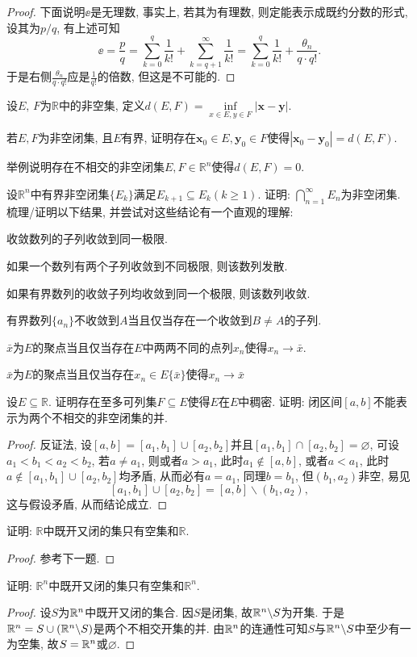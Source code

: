 \begin{quiza}
\begin{proof}
下面说明\(\ee\)是无理数, 事实上, 若其为有理数, 则定能表示成既约分数的形式, 设其为\(p/q\), 有上述可知\[\ee=\frac{p}{q}=\sum_{k=0}^{q}\frac{1}{k!}+\sum_{k=q+1}^{\infty}\frac{1}{k!}=\sum_{k=0}^{q}\frac{1}{k!}+\frac{\theta_n}{q\cdot q!}.\]于是右侧\(\frac{\theta_n}{q\cdot q!}\)应是\(\frac{1}{q!}\)的倍数, 但这是不可能的.
\end{proof}
\woe 设\(E,\,F\)为\(\mathbb{R}\)中的非空集, 定义\(d(E,F)=\underset{x\in E,y\in F}{\inf}|\boldsymbol{x}-\boldsymbol{y}|.\)
\begin{quizs}
      \item 若\(E,F\)为非空闭集, 且\(E\)有界, 证明存在\(\boldsymbol{x}_0\in E,\boldsymbol{y}_0\in F\)使得\(|\boldsymbol{x}_0-\boldsymbol{y}_0|=d(E,F)\).
      \item 举例说明存在不相交的非空闭集\(E,F\in \mathbb{R}^n\)使得\(d(E,F)=0\).
\end{quizs}
\woe 设\(\mathbb{R}^n\)中有界非空闭集\(\{E_k\}\)满足\(E_{k+1}\subseteq E_{k}(k\geqslant 1)\). 证明: \(\bigcap_{n=1}^\infty E_n\)为非空闭集.
\woestar 梳理/证明以下结果, 并尝试对这些结论有一个直观的理解:
\begin{quizcs}
\item 收敛数列的子列收敛到同一极限.
\item 如果一个数列有两个子列收敛到不同极限, 则该数列发散.
\item 如果有界数列的收敛子列均收敛到同一个极限, 则该数列收敛.
\item 有界数列\(\{a_n\}\)不收敛到\(A\)当且仅当存在一个收敛到\(B\ne A\)的子列.
\item \(\bar{x}\)为\(E\)的聚点当且仅当存在\(E\)中两两不同的点列\(x_n\)使得\(x_n\rightarrow \bar{x}\).
\item \(\bar{x}\)为\(E\)的聚点当且仅当存在\(x_n\in E \{\bar{x}\}\)使得\(x_n\rightarrow \bar{x}\)
\end{quizcs}
\begin{solution}
	
\end{solution}
\woe 设\(E\subseteq \mathbb{R}\). 证明存在至多可列集\(F\subseteq E\)使得\(E\)在\(E\)中稠密.
\woe 证明: 闭区间\([a,b]\)不能表示为两个不相交的非空闭集的并.
\begin{proof}
	反证法, 设\([a,b]=[a_1,b_1]\cup [a_2,b_2]\)并且\([a_1,b_1]\cap [a_2,b_2]=\varnothing\), 可设\(a_1<b_1<a_2<b_2\), 若\(a\ne a_1\), 则或者\(a>a_1\), 此时\(a_1\notin [a,b]\), 或者\(a<a_1\), 此时\(a\notin[a_1,b_1]\cup[a_2,b_2]\)均矛盾, 从而必有\(a=a_1\), 同理\(b=b_1\), 但\((b_1,a_2)\)非空, 易见\[[a_1,b_1]\cup [a_2,b_2]=[a,b]\backslash (b_1,a_2),\]这与假设矛盾, 从而结论成立.
\end{proof}
\woe 证明: \(\mathbb{R}\)中既开又闭的集只有空集和\(\mathbb{R}\).
\begin{proof}
参考下一题.	
\end{proof}
\woe 证明: \(\mathbb{R}^n\)中既开又闭的集只有空集和\(\mathbb{R}^n\).
\begin{proof}
	设\(S\)为\(\mathbb{R}^n\)中既开又闭的集合. 因\(S\)是闭集, 故\(\mathbb{R}^n\backslash S\)为开集. 于是\(\mathbb{R}^n=S\cup\left(\mathbb{R}^n\backslash S\right)\)是两个不相交开集的并. 由\(\mathbb{R}^n\)的连通性可知\(S\)与\(\mathbb{R}^n\backslash S\)中至少有一为空集, 故\(S=\mathbb{R}^n\)或\(\varnothing\).
\end{proof}
\end{quiza}
